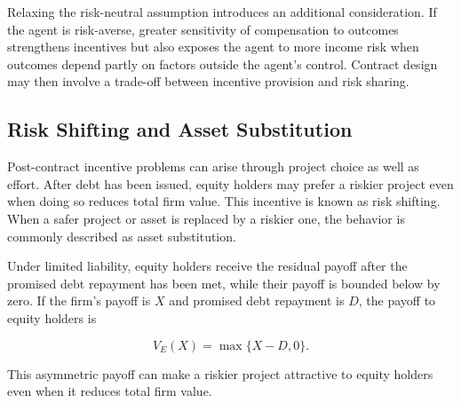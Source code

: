 Relaxing the risk-neutral assumption introduces an additional consideration. If the agent is risk-averse, greater sensitivity of compensation to outcomes strengthens incentives but also exposes the agent to more income risk when outcomes depend partly on factors outside the agent's control. Contract design may then involve a trade-off between incentive provision and risk sharing.

\subsection{Risk Shifting and Asset Substitution}

Post-contract incentive problems can arise through project choice as well as effort. After debt has been issued, equity holders may prefer a riskier project even when doing so reduces total firm value. This incentive is known as risk shifting. When a safer project or asset is replaced by a riskier one, the behavior is commonly described as asset substitution.

Under limited liability, equity holders receive the residual payoff after the promised debt repayment has been met, while their payoff is bounded below by zero.  If the firm's payoff is $X$ and promised debt repayment is $D$, the payoff to equity holders is

\begin{equation}
V_E(X)=\max\{X-D,0\}.
\label{eq:ch3-equity-payoff}
\end{equation}

This asymmetric payoff can make a riskier project attractive to equity holders even when it reduces total firm value.


